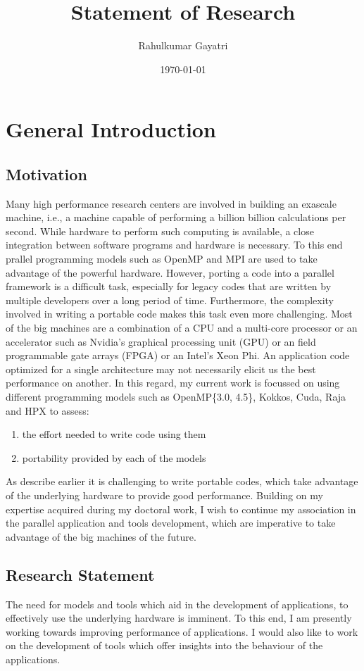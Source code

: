 \documentclass[a4paper]{article}
\title{Statement of Research}
\author{Rahulkumar Gayatri}
\date{\today}
\begin{document}
\fontsize{12}{15}
\selectfont
\maketitle

\section{General Introduction}
\subsection{Motivation}
Many high performance research centers are involved in building an exascale machine, i.e., a machine capable of performing a billion billion calculations per second.
While hardware to perform such computing is available, a close integration between software programs and hardware is necessary.
To this end prallel programming models such as OpenMP and MPI are used to take advantage of the powerful hardware.
However, porting a code into a parallel framework is a difficult task, especially for legacy codes that are written by multiple developers over a long period of time.
Furthermore, the complexity involved in writing a portable code makes this task even more challenging.
Most of the big machines are a combination of a CPU and a multi-core processor or an accelerator such as Nvidia's graphical processing unit (GPU) or an field programmable gate arrays (FPGA) or an Intel's Xeon Phi.
An application code optimized for a single architecture may not necessarily elicit us the best performance on another.
In this regard, my current work is focussed on using different programming models such as OpenMP\{3.0, 4.5\}, Kokkos, Cuda, Raja and HPX to assess:
\begin{enumerate}
    \item the effort needed to write code using them
    \item portability provided by each of the models
\end{enumerate}
As describe earlier it is challenging to write portable codes, which take advantage of the underlying hardware to provide good performance.
Building on my expertise acquired during my doctoral work, I wish to continue my association in the parallel application and tools development, which are imperative to take advantage of the big machines of the future.

\subsection{Research Statement}
The need for models and tools which aid in the development of applications, to effectively use the underlying hardware is imminent.
To this end, I am presently working towards improving performance of applications.
I would also like to work on the development of tools which  offer insights into the behaviour of the applications.
\end{document}
